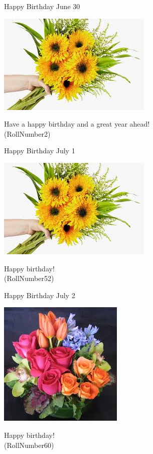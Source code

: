 \documentclass[table, landscape]{beamer}
\begin{document}
\begin{frame}{\color{red}Happy Birthday }
{June 30}
\begin{center}
\includegraphics[height=0.5\textheight]{flowers/f6.jpeg}

Have a happy birthday and a great year ahead! \\ \vspace{0.5cm}{\Large name2} (RollNumber2)
\end{center}
\end{frame}
\begin{frame}{\color{red}Happy Birthday }
{July 1}
\begin{center}
\includegraphics[height=0.5\textheight]{flowers/f6.jpeg}

Happy birthday! \\ \vspace{0.5cm}{\Large name45} (RollNumber52)
\end{center}
\end{frame}
\begin{frame}{\color{blue}Happy Birthday }
{July 2}
\begin{center}
\includegraphics[height=0.5\textheight]{flowers/f9.jpeg}

Happy birthday! \\ \vspace{0.5cm}{\Large name53} (RollNumber60)
\end{center}
\end{frame}
\end{document}
